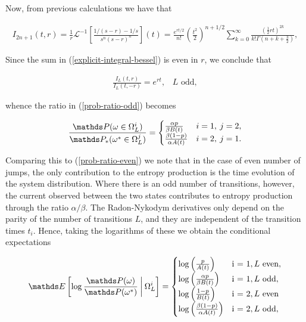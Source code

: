 Now, from previous calculations we have that 

\begin{align}\label{explicit-integral-bessel}
I_{2n+1}(t,r) = \frac{1}{r}\mathcal{L}^{-1}\left [ \frac {1/(s-r)-1/s}{s^n(s-r)^n}\right](t) = \frac{e^{rt/2}}{n!}\left(\frac{t^2}{2}\right)^{n+1/2}\sum_{k=0}^{\infty}\frac{(\frac{1}{2}rt)^{2k}}{k!\Gamma(n+k+\frac{3}{2})},
\end{align}


Since the sum in (\ref{explicit-integral-bessel}) is even in $r$, we conclude that 

\begin{align}
\frac{I_L(t,r)}{I_L(t,-r)} = e^{rt}, \; \; \; \text{$L$ odd},
\end{align}

whence the ratio in (\ref{prob-ratio-odd}) becomes 

\begin{align}
\frac{\bP(\omega \in \Omega^i_L)}{\bP_\ast(\omega^\ast \in \Omega^j_L)} = \begin{cases}\frac{\alpha p}{\beta B(t)} & i = 1, \: j = 2, \\ 
\frac{\beta(1-p)}{\alpha A(t)}& i=2, \: j=1.\end{cases}
\end{align}

Comparing this to (\ref{prob-ratio-even}) we note that in the case of even number of jumps, the only contribution to the entropy production is the time evolution of the system distribution. Where there is an odd number of transitions, however, the current observed between the two states contributes to entropy production through the ratio $\alpha/\beta$. The Radon-Nykodym derivatives only depend  on the parity of the number of transitions $L$, and they are independent of the transition times $t_i$. Hence, taking the logarithms of these we obtain the conditional expectations 

\begin{align}
\bE\left [\log \frac{\bP(\omega)}{\bP(\omega^\ast)} \: \bigg\lvert \: \Omega_L^i  \right] = \begin{cases}\log\left(\frac{p}{A(t)}\right) & $i = 1$, \text{$L$ even},\\
\log\left(\frac{\alpha p}{\beta B(t)}\right) & $i = 1$, \text{$L$ odd},\\
\log\left(\frac{1-p}{B(t)}\right) & $i = 2$, \text{$L$ even}\\
\log\left(\frac{\beta(1-p)}{\alpha A(t)}\right) & $i = 2$, \text{$L$ odd},\end{cases}
\end{align}

